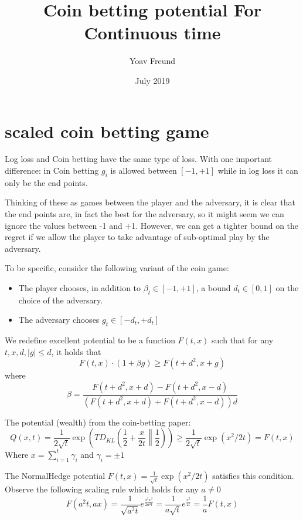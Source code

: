 \documentclass{article}
\title{Coin betting potential For Continuous time}
\author{Yoav Freund}
\date{July 2019}
\begin{document}
\maketitle

\section{scaled coin betting game}

Log loss and Coin betting have the same type of loss. With one important difference: in Coin betting $g_i$ is allowed between $[-1,+1]$ while in log loss it can only be the end points.

Thinking of these as games between the player and the adversary, it is clear that the end points are, in fact the best for the adversary, so it might seem we can ignore the values between -1 and +1. However, we can get a tighter bound on the regret if we allow the player to take advantage of sub-optimal play by the adversary.

To be specific, consider the following variant of the coin game:
\begin{itemize}
\item The player chooses, in addition to $\beta_t \in [-1,+1]$, a bound $d_t \in [0,1]$ on the choice of the adversary.
\item The adversary chooses $g_t \in [-d_t,+d_t]$
\end{itemize}


We redefine excellent potential to be a function $F(t,x)$ such that for any $t,x,d,|g| \leq d$, it holds that 
\begin{equation} \label{eqn:condition}
F(t,x)\cdot(1+\beta g) \geq F(t+d^2,x+g)
\end{equation}
where 
\begin{equation} \label{eqn:beta}
\beta = \frac{F(t+d^2,x+d)-F(t+d^2,x-d)}{(F(t+d^2,x+d)+F(t+d^2,x-d))d}
\end{equation}

The potential (wealth) from the coin-betting paper:
\[
Q(x,t) = \frac{1}{2\sqrt{t}} \exp\left( T D_{KL} \left(\left. \frac{1}{2}+\frac{x}{2t} \right\| \frac{1}{2} \right)\right)
\geq \frac{1}{2\sqrt{t}} \exp(x^2/2t) = F(t,x)
\]
Where $x = \sum_{i=1}^t \gamma_i$ and $\gamma_i = \pm 1$

The NormalHedge potential $F(t,x) = \frac{1}{\sqrt{t}} \exp(x^2/2t)$ satisfies this condition. Observe the following scaling rule which holds for any $a \neq 0$
\begin{equation} \label{eqn:scaling}
F(a^2t,ax) = \frac{1}{\sqrt{a^2t}} e^{\frac{a^2 x^2}{2a^2t}}
=
\frac{1}{a\sqrt{t}} e^{\frac{x^2}{2t}} = \frac{1}{a} F(t,x)
\end{equation}
\end{document}
